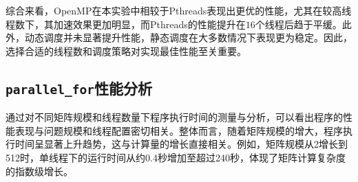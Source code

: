 \documentclass[a4paper, utf8]{ctexart}
\begin{document}
	综合来看，OpenMP在本实验中相较于Pthreads表现出更优的性能，尤其在较高线程数下，其加速效果更加明显，而Pthreads的性能提升在$16$个线程后趋于平缓。此外，动态调度并未显著提升性能，静态调度在大多数情况下表现更为稳定。因此，选择合适的线程数和调度策略对实现最佳性能至关重要。
	
	\subsection{\texttt{parallel\_for}性能分析}
	
	通过对不同矩阵规模和线程数量下程序执行时间的测量与分析，可以看出程序的性能表现与问题规模和线程配置密切相关。整体而言，随着矩阵规模的增大，程序执行时间呈显著上升趋势，这与计算量的增长直接相关。例如，矩阵规模从2增长到512时，单线程下的运行时间从约0.4秒增加至超过240秒，体现了矩阵计算复杂度的指数级增长。
	
\end{document}
